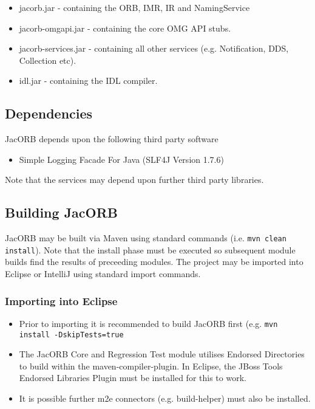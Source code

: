 \begin{itemize}
\item jacorb.jar          - containing the ORB, IMR, IR and NamingService
\item jacorb-omgapi.jar   - containing the core OMG API stubs.
\item jacorb-services.jar - containing all other services (e.g. Notification, DDS, Collection etc).
\item idl.jar             - containing the IDL compiler.
\end{itemize}

\subsection{Dependencies}

JacORB depends upon the following third party software
\begin{itemize}
\item Simple Logging Facade For Java (SLF4J Version 1.7.6)
\end{itemize}

Note that the services may depend upon further third party libraries.

\subsection{Building JacORB}
\label{sec:building}

JacORB may be built via Maven using standard commands (i.e. {\tt mvn clean install}). Note that the install
phase must be executed so subsequent module builds find the results of preceeding modules. The project may be
imported into Eclipse or IntelliJ using standard import commands.

\subsubsection{Importing into Eclipse}
\begin{itemize}
\item Prior to importing it is recommended to build JacORB first (e.g. {\tt mvn install -DskipTests=true}
\item The JacORB Core and Regression Test module utilises Endorsed Directories to build within the maven-compiler-plugin. In Eclipse, the JBoss Tools Endorsed Libraries Plugin must be installed for this to work.
\item It is possible further m2e connectors (e.g. build-helper) must also be installed.
\end{itemize}

